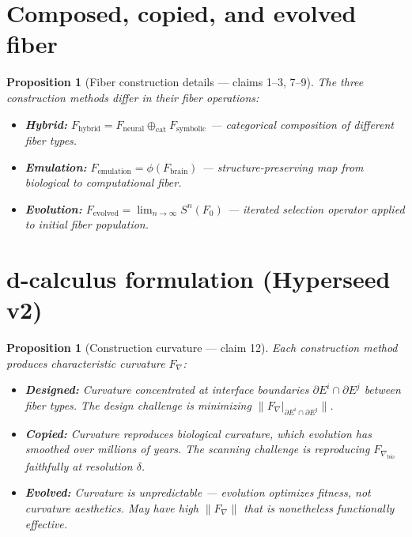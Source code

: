 \documentclass[11pt,a4paper]{article}
\newtheorem{proposition}[definition]{Proposition}
\begin{document}
\section{Composed, copied, and evolved fiber}

\begin{proposition}[Fiber construction details --- claims 1--3, 7--9]
The three construction methods differ in their fiber operations:
\begin{itemize}
\item \textbf{Hybrid:} $F_{\text{hybrid}} = F_{\text{neural}} \oplus_{\text{cat}} F_{\text{symbolic}}$
  --- categorical composition of different fiber types.
\item \textbf{Emulation:} $F_{\text{emulation}} = \phi(F_{\text{brain}})$
  --- structure-preserving map from biological to computational fiber.
\item \textbf{Evolution:} $F_{\text{evolved}} = \lim_{n \to \infty} S^n(F_0)$
  --- iterated selection operator applied to initial fiber population.
\end{itemize}
\end{proposition}

\section{d-calculus formulation (Hyperseed v2)}

\begin{proposition}[Construction curvature --- claim 12]
\label{prop:curvature}
Each construction method produces characteristic curvature $F_\nabla$:
\begin{itemize}
  \item \textbf{Designed:} Curvature concentrated at interface boundaries
    $\partial E^i \cap \partial E^j$ between fiber types. The design
    challenge is minimizing $\|F_\nabla|_{\partial E^i \cap \partial E^j}\|$.
  \item \textbf{Copied:} Curvature reproduces biological curvature, which
    evolution has smoothed over millions of years. The scanning challenge is
    reproducing $F_{\nabla_{\text{bio}}}$ faithfully at resolution $\delta$.
  \item \textbf{Evolved:} Curvature is unpredictable --- evolution optimizes
    fitness, not curvature aesthetics. May have high $\|F_\nabla\|$ that is
    nonetheless functionally effective.
\end{itemize}
\end{proposition}
\end{document}
